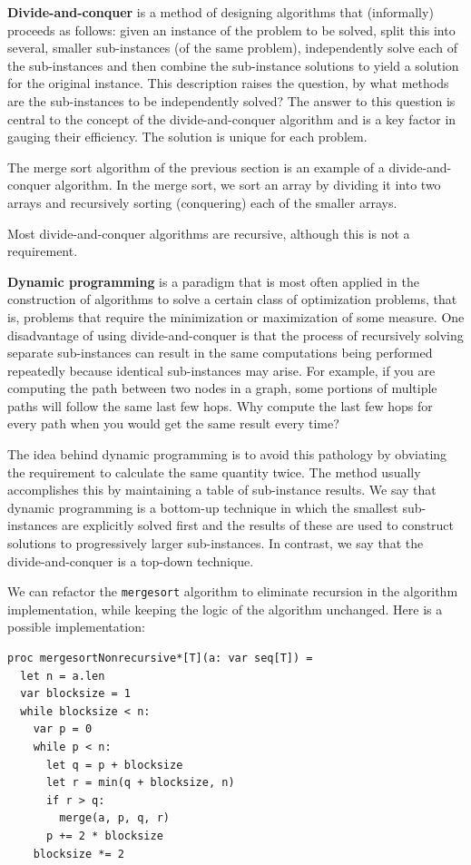 \documentclass[justified, sixbynine]{tufte-book}
\def\ft{\small\tt}
\theoremstyle{plain}%
\newtheorem * {corollary}{Corollary}
\theoremstyle{definition}
\theoremstyle{remark}
\newtheorem * {remark}{Remark}
\newtheorem * {note}{Note}
\begin{document}
\begin{fullwidth}

{\bf Divide-and-conquer}
 is a method of designing algorithms that
(informally) proceeds as follows: given an instance of the problem to be
solved, split this into several, smaller sub-instances (of the same
problem), independently solve each of the sub-instances and then combine the
sub-instance solutions to yield a solution for the original instance.
This description raises the question, by what methods are the sub-instances
to be independently solved? The answer to this question is central to the
concept of the divide-and-conquer algorithm and is a key factor in gauging
their efficiency. The solution is unique for each problem.

The merge sort algorithm of the previous section is an example of a divide-and-conquer algorithm. In the merge sort, we sort an array by dividing it into two arrays and recursively sorting (conquering) each of the smaller arrays.

Most divide-and-conquer algorithms are recursive, although this is not a requirement.

{\bf Dynamic programming}
is a paradigm that is most often applied in the
construction of algorithms to solve a certain class of optimization
problems, that is, problems that require the minimization or maximization of
some measure. One disadvantage of using divide-and-conquer is that the
process of recursively solving separate sub-instances can result in the same
computations being performed repeatedly because identical sub-instances may
arise. For example, if you are computing the path between two nodes in a graph, 
some portions of multiple paths will follow the same last few hops. Why compute
the last few hops for every path when you would get the same result every time?

The idea behind dynamic programming is to avoid this pathology by
obviating the requirement to calculate the same quantity twice. The method
usually accomplishes this by maintaining a table of sub-instance results. We
say that dynamic programming is a bottom-up technique in which the smallest
sub-instances are explicitly solved first and the results of these are used to
construct solutions to progressively larger sub-instances. In contrast, we
say that the divide-and-conquer is a top-down technique.


We can refactor the {\ft mergesort} algorithm to eliminate recursion in the algorithm implementation, while keeping the logic of the algorithm unchanged. Here is a possible implementation:
\begin{lstlisting}
proc mergesortNonrecursive*[T](a: var seq[T]) =
  let n = a.len
  var blocksize = 1
  while blocksize < n:
    var p = 0
    while p < n:
      let q = p + blocksize
      let r = min(q + blocksize, n)
      if r > q:
        merge(a, p, q, r)
      p += 2 * blocksize
    blocksize *= 2
\end{lstlisting}


\end{fullwidth}
\end{document}
